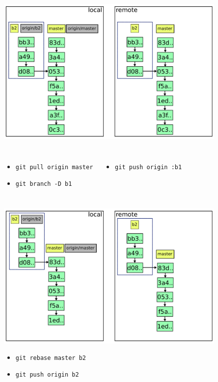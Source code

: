 \documentclass{beamer}
\begin{document}
\begin{frame}{}
  \centering
  \includegraphics[width=0.85\textwidth]{img/8.pdf}
  \begin{columns}
  \begin{itemize}
  \small
  \item \lstinline|git pull origin master|
  \item \lstinline|git branch -D b1|
  \end{itemize}
  \begin{itemize}
  \small
  \item \lstinline|git push origin :b1|
  \end{itemize}
  \end{columns}
\end{frame}

\begin{frame}{}
  \centering
  \includegraphics[width=0.85\textwidth]{img/9.pdf}
  \begin{itemize}
  \small
  \item \lstinline|git rebase master b2|
  \item \lstinline|git push origin b2|
  \end{itemize}
\end{frame}
\end{document}
